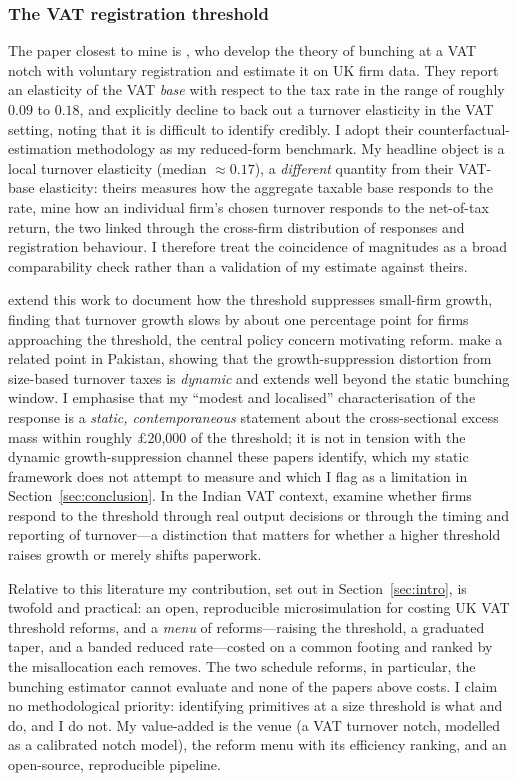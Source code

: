 \subsubsection{The VAT registration threshold}

The paper closest to mine is \citet{liuetal2021}, who develop the theory of bunching
at a VAT notch with voluntary registration and estimate it on UK firm data. They report
an elasticity of the VAT \emph{base} with respect to the tax rate in the range of roughly
$0.09$ to $0.18$, and explicitly decline to back out a turnover elasticity in the VAT
setting, noting that it is difficult to identify credibly. I adopt their
counterfactual-estimation methodology as my reduced-form benchmark. My headline object
is a local turnover elasticity (median $\approx 0.17$), a \emph{different} quantity from
their VAT-base elasticity: theirs measures how the aggregate taxable base responds to the
rate, mine how an individual firm's chosen turnover responds to the net-of-tax return,
the two linked through the cross-firm distribution of responses and registration
behaviour. I therefore treat the coincidence of magnitudes as a broad comparability check
rather than a validation of my estimate against theirs.

\citet{liulockwoodtam2024} extend this work to document how the threshold suppresses
small-firm growth, finding that turnover growth slows by about one percentage point
for firms approaching the threshold, the central policy concern motivating reform. \citet{waseem2024} make a related point in
Pakistan, showing that the growth-suppression distortion from size-based turnover taxes
is \emph{dynamic} and extends well beyond the static bunching window. I emphasise that
my ``modest and localised'' characterisation of the response is a \emph{static,
contemporaneous} statement about the cross-sectional excess mass within roughly
\pounds 20{,}000 of the threshold; it is not in tension with the dynamic
growth-suppression channel these papers identify, which my static framework does not
attempt to measure and which I flag as a limitation in Section~\ref{sec:conclusion}.
In the Indian VAT context, \citet{nandiwarwick2020} examine whether firms respond to
the threshold through real output decisions or through the timing and reporting of
turnover---a distinction that matters for whether a higher threshold raises growth or
merely shifts paperwork.

Relative to this literature my contribution, set out in Section~\ref{sec:intro}, is
twofold and practical: an open, reproducible microsimulation for costing UK VAT
threshold reforms, and a \emph{menu} of reforms---raising the threshold, a graduated
taper, and a banded reduced rate---costed on a common footing and ranked by the
misallocation each removes. The two schedule reforms, in particular, the bunching
estimator cannot evaluate and none of the papers above costs. I claim no methodological
priority: identifying primitives at a size threshold is what \citet{garicano2016} and
\citet{gourioroys2014} do, and I do not. My value-added is the venue (a VAT turnover
notch, modelled as a calibrated \citet{klevenwaseem2013} notch model), the reform menu
with its efficiency ranking, and an open-source, reproducible pipeline.


